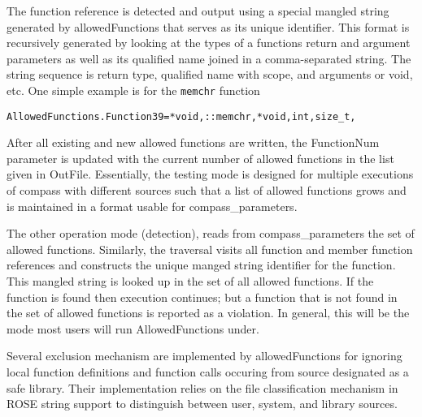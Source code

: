 The function reference is detected and output using a special
mangled string generated by allowedFunctions that serves as its unique
identifier. This format is recursively generated by looking at the types of
a functions return and argument parameters as well as its qualified name
joined in a comma-separated string. The string sequence is return type, 
qualified name with scope, and arguments or void, etc. 
One simple example is for the {\tt memchr} function

\begin{verbatim}
AllowedFunctions.Function39=*void,::memchr,*void,int,size_t,
\end{verbatim}

After all existing and new allowed functions are written, the FunctionNum
parameter is updated with the current number of allowed functions in the list
given in OutFile. Essentially, the testing mode is designed for multiple
executions of compass with different sources such that a list of allowed
functions grows and is maintained in a format usable for compass\_parameters.

The other operation mode (detection), reads from compass\_parameters the set 
of allowed functions. Similarly, the traversal visits all function and
member function references and constructs the unique manged string identifier
for the function. This mangled string is looked up in the set of all allowed
functions. If the function is found then execution continues; but a function
that is not found in the set of allowed functions is reported as a violation.
In general, this will be the mode most users will run AllowedFunctions under.

Several exclusion mechanism are implemented by allowedFunctions for ignoring
local function definitions and function calls occuring from source designated
as a safe library. Their implementation relies on the file classification
mechanism in ROSE string support to distinguish between user, system, and
library sources.
